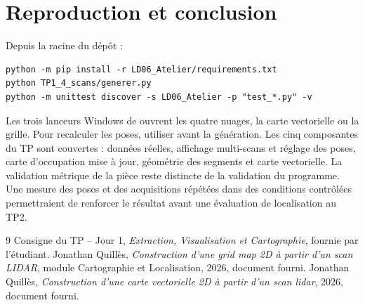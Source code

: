 \documentclass[11pt,a4paper]{article}
\begin{document}
\section{Reproduction et conclusion}
Depuis la racine du dépôt :
\begin{verbatim}
python -m pip install -r LD06_Atelier/requirements.txt
python TP1_4_scans/generer.py
python -m unittest discover -s LD06_Atelier -p "test_*.py" -v
\end{verbatim}
Les trois lanceurs Windows de  ouvrent les quatre nuages, la carte vectorielle ou la grille. Pour recalculer les poses, utiliser  avant la génération.
Les cinq composantes du TP sont couvertes : données réelles, affichage multi-scans et réglage des poses, carte d'occupation mise à jour, géométrie des segments et carte vectorielle. La validation métrique de la pièce reste distincte de la validation du programme. Une mesure des poses et des acquisitions répétées dans des conditions contrôlées permettraient de renforcer le résultat avant une évaluation de localisation au TP2.

\begin{thebibliography}{9}
 Consigne du TP -- Jour 1, \emph{Extraction, Visualisation et Cartographie}, fournie par l'étudiant.
 Jonathan Quillès, \emph{Construction d'une grid map 2D à partir d'un scan LIDAR}, module Cartographie et Localisation, 2026, document fourni.
 Jonathan Quillès, \emph{Construction d'une carte vectorielle 2D à partir d'un scan lidar}, 2026, document fourni.
\end{thebibliography}
\end{document}
